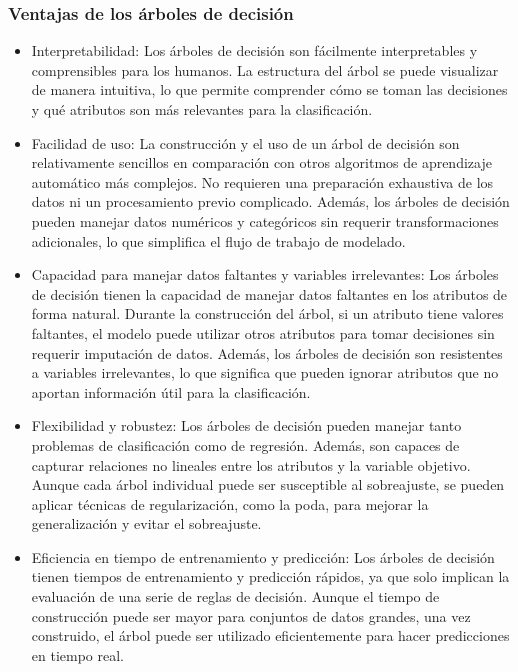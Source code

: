 \subsubsection{Ventajas de los árboles de decisión}
\begin{itemize}
    \item Interpretabilidad: Los árboles de decisión son fácilmente interpretables y comprensibles para los humanos. La estructura del árbol se puede visualizar de manera intuitiva, lo que permite comprender cómo se toman las decisiones y qué atributos son más relevantes para la clasificación.
    \item Facilidad de uso: La construcción y el uso de un árbol de decisión son relativamente sencillos en comparación con otros algoritmos de aprendizaje automático más complejos. No requieren una preparación exhaustiva de los datos ni un procesamiento previo complicado. Además, los árboles de decisión pueden manejar datos numéricos y categóricos sin requerir transformaciones adicionales, lo que simplifica el flujo de trabajo de modelado.
    \item Capacidad para manejar datos faltantes y variables irrelevantes: Los árboles de decisión tienen la capacidad de manejar datos faltantes en los atributos de forma natural. Durante la construcción del árbol, si un atributo tiene valores faltantes, el modelo puede utilizar otros atributos para tomar decisiones sin requerir imputación de datos. Además, los árboles de decisión son resistentes a variables irrelevantes, lo que significa que pueden ignorar atributos que no aportan información útil para la clasificación.
    \item Flexibilidad y robustez: Los árboles de decisión pueden manejar tanto problemas de clasificación como de regresión. Además, son capaces de capturar relaciones no lineales entre los atributos y la variable objetivo. Aunque cada árbol individual puede ser susceptible al sobreajuste, se pueden aplicar técnicas de regularización, como la poda, para mejorar la generalización y evitar el sobreajuste.
    \item Eficiencia en tiempo de entrenamiento y predicción: Los árboles de decisión tienen tiempos de entrenamiento y predicción rápidos, ya que solo implican la evaluación de una serie de reglas de decisión. Aunque el tiempo de construcción puede ser mayor para conjuntos de datos grandes, una vez construido, el árbol puede ser utilizado eficientemente para hacer predicciones en tiempo real.
\end{itemize}

